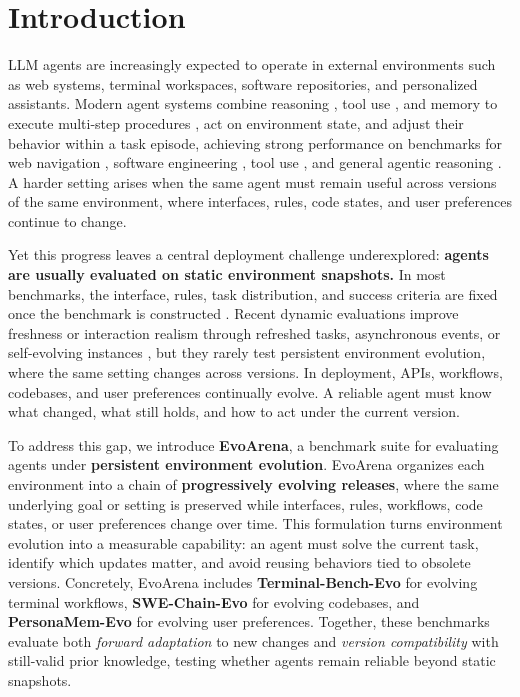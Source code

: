 \documentclass{article}
\begin{document}
\newpage



\section{Introduction}
\vspace{-1mm}

LLM agents are increasingly expected to operate in external environments such as web systems, terminal workspaces, software repositories, and personalized assistants. Modern agent systems combine reasoning \cite{react}, tool use \cite{memento-s}, and memory to execute multi-step procedures \cite{xu2025amem}, act on environment state, and adjust their behavior within a task episode, achieving strong performance on benchmarks for web navigation \cite{zhou2023webarena}, software engineering \cite{jimenez2024swebench}, tool use \cite{mialon2024gaia}, and general agentic reasoning \cite{mialon2024gaia}. A harder setting arises when the same agent must remain useful across versions of the same environment, where interfaces, rules, code states, and user preferences continue to change.



Yet this progress leaves a central deployment challenge underexplored: \textbf{agents are usually evaluated on static environment snapshots.} In most benchmarks, the interface, rules, task distribution, and success criteria are fixed once the benchmark is constructed \cite{jimenez2024swebench,liu2024agentbench,mialon2024gaia,zhou2023webarena}. Recent dynamic evaluations improve freshness or interaction realism through refreshed tasks, asynchronous events, or self-evolving instances \cite{gaia2,li2026swe-benchl-ive,benchmark-selfevolv}, but they rarely test persistent environment evolution, where the same setting changes across versions. In deployment, APIs, workflows, codebases, and user preferences continually evolve. A reliable agent must know what changed, what still holds, and how to act under the current version.




To address this gap, we introduce \textbf{EvoArena}, a benchmark suite for evaluating agents under \textbf{persistent environment evolution}. EvoArena organizes each environment into a chain of \textbf{progressively evolving releases}, where the same underlying goal or setting is preserved while interfaces, rules, workflows, code states, or user preferences change over time. This formulation turns environment evolution into a measurable capability: an agent must solve the current task, identify which updates matter, and avoid reusing behaviors tied to obsolete versions. Concretely, EvoArena includes \textbf{Terminal-Bench-Evo} for evolving terminal workflows,  \textbf{SWE-Chain-Evo} for evolving codebases, and \textbf{PersonaMem-Evo} for evolving user preferences. Together, these benchmarks evaluate both \textit{forward adaptation} to new changes and \textit{version compatibility} with still-valid prior knowledge, testing whether agents remain reliable beyond static snapshots.
\end{document}
